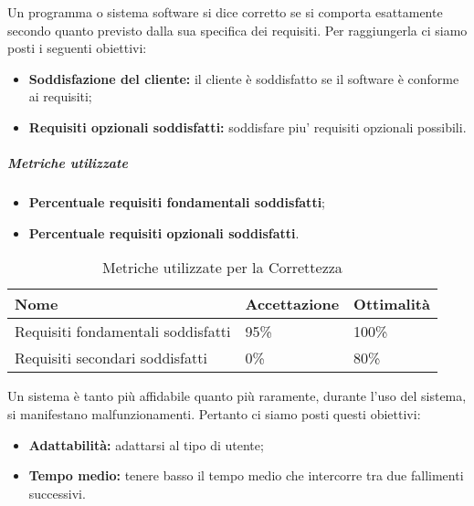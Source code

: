 Un programma o sistema software si dice corretto se si comporta esattamente secondo quanto previsto dalla sua specifica dei requisiti. Per raggiungerla ci siamo posti i seguenti obiettivi:
\begin{itemize}
	\item \textbf{Soddisfazione del cliente:} il cliente è soddisfatto se il software è conforme ai requisiti;
	\item \textbf{Requisiti opzionali soddisfatti:} soddisfare piu' requisiti opzionali possibili.
\end{itemize}
\subparagraph{Metriche utilizzate}
\begin{itemize}
	\item \textbf{Percentuale requisiti fondamentali soddisfatti};
	\item \textbf{Percentuale requisiti opzionali soddisfatti}.
\end{itemize}
\begin{table}[!htpb]
	\centering
	\renewcommand{\arraystretch}{2} 
		\begin{tabular}{|l|l|l|}
			\rowcolor{orange!50}
			\hline
			\textbf{Nome} & \textbf{Accettazione} & \textbf{Ottimalità} \\ \hline
			Requisiti fondamentali soddisfatti  &  95\%  &  100\%      \\ \hline
			Requisiti secondari soddisfatti  &   0\% &   80\%     \\ \hline
		\end{tabular}
	\caption{Metriche utilizzate per la Correttezza}
\end{table}
	Un sistema è tanto più affidabile quanto più raramente, durante l'uso del sistema, si manifestano malfunzionamenti. Pertanto ci siamo posti questi obiettivi:
	\begin{itemize}
	\item \textbf{Adattabilità:} adattarsi al tipo di utente;
	\item \textbf{Tempo medio:} tenere basso il tempo medio che intercorre tra due fallimenti successivi.
\end{itemize}

